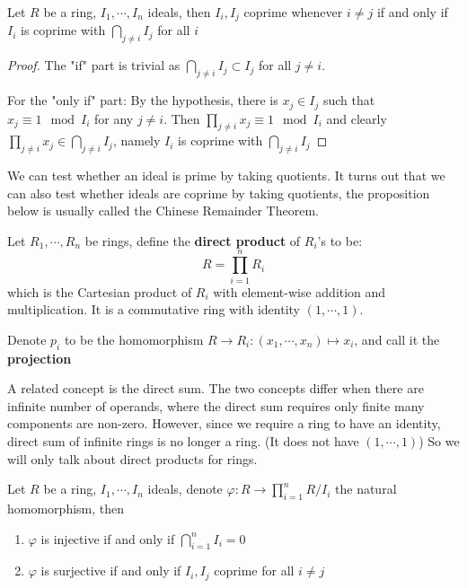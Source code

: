 \documentclass{note-eng}
\begin{document}
\begin{lemma}\label{lem:coprime}
    Let $R$ be a ring, $I_1, \cdots, I_n$ ideals, then $I_i, I_j$ coprime whenever $i \ne j$ if and only if $I_i$ is coprime with $\bigcap\limits_{j \ne i} I_j$ for all $i$
\end{lemma}

\begin{proof}
    The "if" part is trivial as $\bigcap\limits_{j \ne i} I_j \subset I_j$ for all $j \ne i$.

    For the "only if" part: By the hypothesis, there is $x_j \in I_j$ such that $x_j \equiv 1 \mod I_i$ for any $j \ne i$. Then $\prod\limits_{j \ne i} x_j \equiv 1 \mod I_i$ and clearly $\prod\limits_{j \ne i} x_j \in \bigcap\limits_{j \ne i}I_j$, namely $I_i$ is coprime with $\bigcap\limits_{j \ne i} I_j$
\end{proof}

We can test whether an ideal is prime by taking quotients. It turns out that we can also test whether ideals are coprime by taking quotients, the proposition below is usually called the Chinese Remainder Theorem.

\begin{definition}
    Let $R_1, \cdots, R_n$ be rings, define the \textbf{direct product} of $R_i$'s to be:
    $$R = \prod\limits_{i = 1}^{n} R_i$$
    which is the Cartesian product of $R_i$ with element-wise addition and multiplication. It is a commutative ring with identity $(1, \cdots, 1)$.
    
    Denote $p_i$ to be the homomorphism $R \rightarrow R_i: (x_1, \cdots, x_n) \mapsto x_i$, and call it the \textbf{projection}
\end{definition}

\begin{remark}
    A related concept is the direct sum. The two concepts differ when there are infinite number of operands, where the direct sum requires only finite many components are non-zero. However, since we require a ring to have an identity, direct sum of infinite rings is no longer a ring. (It does not have $(1, \cdots, 1)$) So we will only talk about direct products for rings.
\end{remark}

\begin{proposition}
    Let $R$ be a ring, $I_1, \cdots, I_n$ ideals, denote $\varphi: R \rightarrow \prod\limits_{i = 1}^{n} R / I_i$ the natural homomorphism, then
    \begin{enumerate}
        \item $\varphi$ is injective if and only if $\bigcap\limits_{i = 1}^{n} I_i = 0$
        \item $\varphi$ is surjective if and only if $I_i, I_j$ coprime for all $i \ne j$
    \end{enumerate}
\end{proposition}
\end{document}
